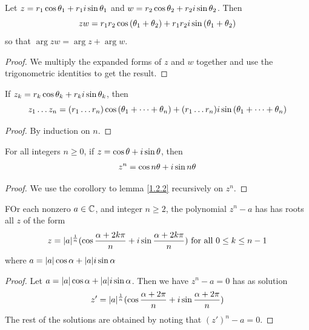 \begin{lemma}\label{1.2.2}
    Let $z=r_1\cos{\theta_1}+r_1i\sin{\theta_1}$ and
    $w=r_2\cos{\theta_2}+r_2i\sin{\theta_2}$. Then
    \begin{equation*}
        zw=r_1r_2\cos{(\theta_1+\theta_2)}+r_1r_2i\sin{(\theta_1+\theta_2)}
    \end{equation*}
    so that  $\arg{zw}=\arg{z}+\arg{w}$.
\end{lemma}
\begin{proof}
    We multiply the expanded forms of $z$ and  $w$ together and use the
    trigonometric identities to get the result.
\end{proof}
\begin{corollary}
    If $z_k=r_k\cos{\theta_k}+r_ki\sin{\theta_k}$, then
    \begin{equation*}
        z_1 \dots z_n=(r_1 \dots r_n)\cos{(\theta_1+\dots+\theta_n)}+
        (r_1 \dots r_n)i\sin{(\theta_1+\dots+\theta_n)}
    \end{equation*}
\end{corollary}
\begin{proof}
    By induction on $n$.
\end{proof}

\begin{theorem}\label{1.2.3}
    For all integers $n \geq 0$, if  $z=\cos{\theta}+i\sin{\theta}$, then
    \begin{equation*}
        z^n=\cos{n\theta}+i\sin{n\theta}
    \end{equation*}
\end{theorem}
\begin{proof}
    We use the corollory to lemma \ref{1.2.2} recursively on $z^n$.
\end{proof}

\begin{lemma}\label{1.2.4}
    FOr each nonzero $a \in \mathbb{C}$, and integer $n \geq 2$, the  polynomial $z^n-a$
    has has roots all  $z$ of the form
    \begin{equation*}
        z=|a|^{\frac{1}{n}}(\cos{\frac{\alpha+2k\pi}{n}}+
        i\sin{\frac{\alpha+2k\pi}{n}}) \text{ for all } 0 \leq k \leq n-1
    \end{equation*}
    where $a=|a|\cos{\alpha}+|a|i\sin{\alpha}$
\end{lemma}
\begin{proof}
    Let $a=|a|\cos{\alpha}+|a|i\sin{\alpha}$. Then we have $z^n-a=0$ has as solution
    \begin{equation*}
        z'=|a|^{\frac{1}{n}}(\cos{\frac{\alpha+2\pi}{n}}+i\sin{\frac{\alpha+2\pi}{n}})
    \end{equation*}
    The rest of the solutions are obtained by noting that $(z')^n-a=0$.
\end{proof}

